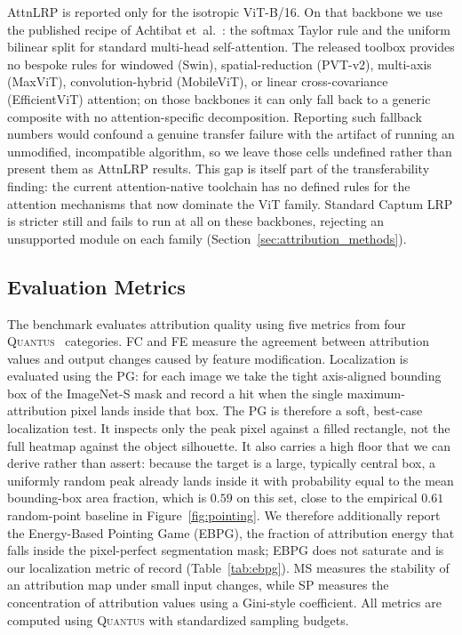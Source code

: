 \documentclass[final,5p,times,twocolumn]{elsarticle}
\begin{document}
AttnLRP is reported only for the isotropic ViT-B/16. On that backbone we use the published recipe of Achtibat et~al.~\cite{achtibat2024attnlrp}: the softmax Taylor rule and the uniform bilinear split for standard multi-head self-attention. The released toolbox provides no bespoke rules for windowed (Swin), spatial-reduction (PVT-v2), multi-axis (MaxViT), convolution-hybrid (MobileViT), or linear cross-covariance (EfficientViT) attention; on those backbones it can only fall back to a generic composite with no attention-specific decomposition. Reporting such fallback numbers would confound a genuine transfer failure with the artifact of running an unmodified, incompatible algorithm, so we leave those cells undefined rather than present them as AttnLRP results. This gap is itself part of the transferability finding: the current attention-native toolchain has no defined rules for the attention mechanisms that now dominate the ViT family. Standard Captum LRP is stricter still and fails to run at all on these backbones, rejecting an unsupported module on each family (Section~\ref{sec:attribution_methods}).

\subsection{Evaluation Metrics}

The benchmark evaluates attribution quality using five metrics from four \textsc{Quantus}~\cite{hedstrom2023quantus} categories. FC and FE measure the agreement between attribution values and output changes caused by feature modification. Localization is evaluated using the PG: for each image we take the tight axis-aligned bounding box of the ImageNet-S mask and record a hit when the single maximum-attribution pixel lands inside that box. The PG is therefore a soft, best-case localization test. It inspects only the peak pixel against a filled rectangle, not the full heatmap against the object silhouette. It also carries a high floor that we can derive rather than assert: because the target is a large, typically central box, a uniformly random peak already lands inside it with probability equal to the mean bounding-box area fraction, which is $0.59$ on this set, close to the empirical $0.61$ random-point baseline in Figure~\ref{fig:pointing}. We therefore additionally report the Energy-Based Pointing Game (EBPG), the fraction of attribution energy that falls inside the pixel-perfect segmentation mask; EBPG does not saturate and is our localization metric of record (Table~\ref{tab:ebpg}). MS measures the stability of an attribution map under small input changes, while SP measures the concentration of attribution values using a Gini-style coefficient. All metrics are computed using \textsc{Quantus} with standardized sampling budgets.
\end{document}
